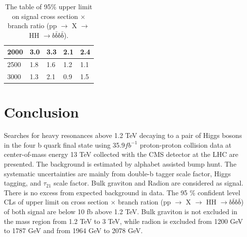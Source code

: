 \begin{table}[]
\begin{tabular}{|l|l|l|l|l|}
2000                                                    & 3.0                                                       & 3.3                                                       & 2.1                                                              & 2.4                                                               \\ \hline
2500                                                    & 1.8                                                       & 1.6                                                       & 1.2                                                              & 1.1                                                               \\ \hline
3000                                                    & 1.3                                                       & 2.1                                                       & 0.9                                                              & 1.5                                                               \\ \hline
\end{tabular}
\caption{The table of 95$\% $ upper limit on signal cross section $\times $ branch ratio (pp $\rightarrow$ X $\rightarrow$ HH $\rightarrow b\bar{b}b\bar{b}$).}
\end{table}

\section{Conclusion}
Searches for heavy resonances above 1.2 TeV decaying to a pair of Higgs
bosons in the four b quark final state using 35.9$fb^{-1}$ proton-proton collision data at center-of-mass energy 13 TeV collected with the CMS detector at the LHC are presented. The background is estimated by alphabet assisted bump hunt. The systematic uncertainties are mainly from double-b tagger scale factor, Higgs tagging, and $\tau_{21}$ scale factor. Bulk graviton and Radion are considered as signal. There is no excess from expected background in data. The 95 $\% $ confident level CLs of upper limit on cross section $\times$ branch ration (pp $\rightarrow$ X $\rightarrow$ HH $\rightarrow b\bar{b}b\bar{b}$) of both signal are below 10 fb above 1.2 TeV. Bulk graviton is not excluded in the mass region from 1.2 TeV to 3 TeV, while radion is excluded from 1200 GeV to 1787 GeV and from 1964 GeV to 2078 GeV. 
 